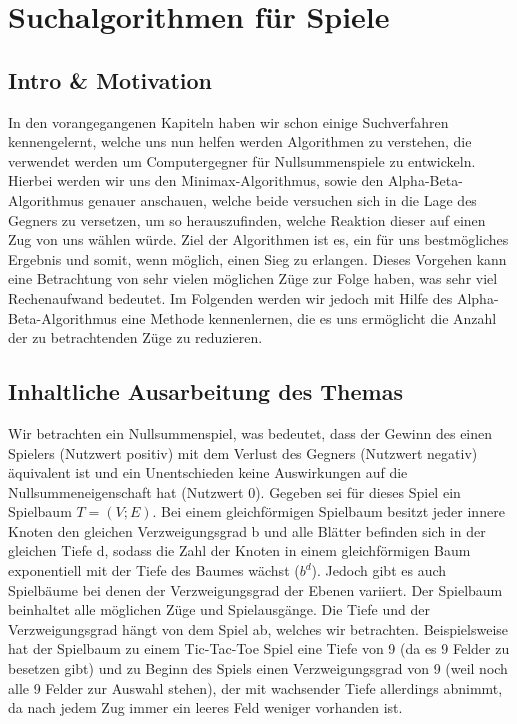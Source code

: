 
\chapter{Suchalgorithmen für Spiele}

\usetikzlibrary{calc}
\usetikzlibrary{positioning}
\usetikzlibrary{matrix}



\section{Intro \& Motivation}

In den vorangegangenen Kapiteln haben wir schon einige Suchverfahren kennengelernt, welche uns nun helfen werden Algorithmen zu verstehen, die verwendet werden um Computergegner für Nullsummenspiele zu entwickeln. Hierbei werden wir uns den Minimax-Algorithmus, sowie den Alpha-Beta-Algorithmus genauer anschauen, welche beide versuchen sich in die Lage des Gegners zu versetzen, um so  herauszufinden, welche Reaktion dieser auf einen Zug von uns wählen würde. Ziel der Algorithmen ist es, ein für uns bestmögliches Ergebnis und somit, wenn möglich, einen Sieg zu erlangen. Dieses Vorgehen kann eine Betrachtung von sehr vielen möglichen Züge zur Folge haben, was sehr viel Rechenaufwand bedeutet. Im Folgenden werden wir jedoch  mit Hilfe des Alpha-Beta-Algorithmus eine Methode kennenlernen, die es uns ermöglicht die Anzahl der zu betrachtenden Züge zu reduzieren.



\section{Inhaltliche Ausarbeitung des Themas}

Wir betrachten ein Nullsummenspiel, was bedeutet, dass der Gewinn des einen Spielers (Nutzwert positiv) mit dem Verlust des Gegners (Nutzwert negativ) äquivalent ist und ein Unentschieden keine Auswirkungen auf die Nullsummeneigenschaft hat (Nutzwert 0).
Gegeben sei für dieses Spiel ein Spielbaum $T = (V;E)$. Bei einem gleichförmigen Spielbaum besitzt jeder innere Knoten den gleichen Verzweigungsgrad b und alle Blätter befinden sich in der gleichen Tiefe d, sodass die Zahl der Knoten in einem gleichförmigen Baum exponentiell mit der Tiefe des Baumes wächst ($b^d$). Jedoch gibt es auch Spielbäume bei denen der Verzweigungsgrad der Ebenen variiert.
Der Spielbaum beinhaltet alle möglichen Züge und Spielausgänge. Die Tiefe und der Verzweigungsgrad hängt von dem Spiel ab, welches wir betrachten. Beispielsweise hat der Spielbaum zu einem Tic-Tac-Toe Spiel eine Tiefe von 9 (da es 9 Felder zu besetzen gibt) und zu Beginn des Spiels einen Verzweigungsgrad von 9 (weil noch alle 9 Felder zur Auswahl stehen), der mit wachsender Tiefe allerdings abnimmt, da nach jedem Zug immer ein leeres Feld weniger vorhanden ist.



